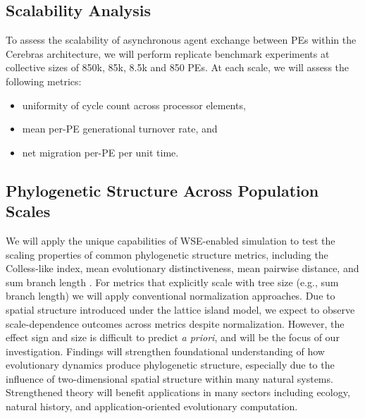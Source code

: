 \subsection{Scalability Analysis}

To assess the scalability of asynchronous agent exchange between PEs within the Cerebras architecture, we will perform replicate benchmark experiments at collective sizes of 850k, 85k, 8.5k and 850 PEs.
At each scale, we will assess the following metrics:
\begin{itemize}
\item uniformity of cycle count across processor elements,
\item mean per-PE generational turnover rate, and
\item net migration per-PE per unit time.
\end{itemize}

\subsection{Phylogenetic Structure Across Population Scales}

We will apply the unique capabilities of WSE-enabled simulation to test the scaling properties of common phylogenetic structure metrics, including the Colless-like index, mean evolutionary distinctiveness, mean pairwise distance, and sum branch length \citep{tucker2017guide}.
For metrics that explicitly scale with tree size (e.g., sum branch length) we will apply conventional normalization approaches.
Due to spatial structure introduced under the lattice island model, we expect to observe scale-dependence outcomes across metrics despite normalization.
However, the effect sign and size is difficult to predict \textit{a priori}, and will be the focus of our investigation.
Findings will strengthen foundational understanding of how evolutionary dynamics produce phylogenetic structure, especially due to the influence of two-dimensional spatial structure within many natural systems.
Strengthened theory will benefit applications in many sectors including ecology, natural history, and application-oriented evolutionary computation.

